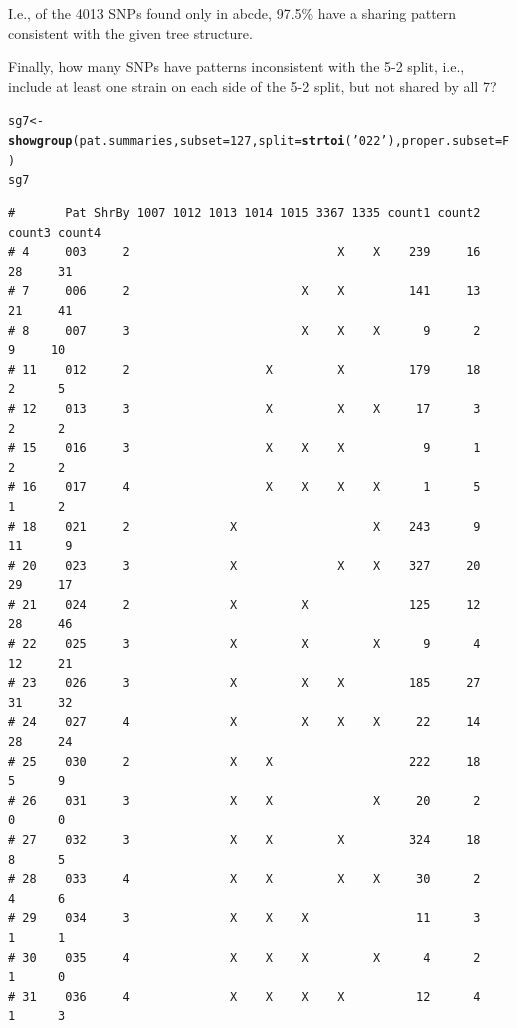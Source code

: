 \documentclass{article}\usepackage[]{graphicx}\usepackage[]{color}
\makeatletter
\newcommand{\hlnum}[1]{\textcolor[rgb]{0.686,0.059,0.569}{#1}}%
\newcommand{\hlstr}[1]{\textcolor[rgb]{0.192,0.494,0.8}{#1}}%
\newcommand{\hlstd}[1]{\textcolor[rgb]{0.345,0.345,0.345}{#1}}%
\newcommand{\hlkwb}[1]{\textcolor[rgb]{0.69,0.353,0.396}{#1}}%
\newcommand{\hlkwc}[1]{\textcolor[rgb]{0.333,0.667,0.333}{#1}}%
\newcommand{\hlkwd}[1]{\textcolor[rgb]{0.737,0.353,0.396}{\textbf{#1}}}%
\newenvironment{kframe}{%
 \def\at@end@of@kframe{}%
 \ifinner\ifhmode%
  \def\at@end@of@kframe{\end{minipage}}%
  \begin{minipage}{\columnwidth}%
 \fi\fi%
 \def\FrameCommand##1{\hskip\@totalleftmargin \hskip-\fboxsep
 \colorbox{shadecolor}{##1}\hskip-\fboxsep
     \hskip-\linewidth \hskip-\@totalleftmargin \hskip\columnwidth}%
 \MakeFramed {\advance\hsize-\width
   \@totalleftmargin\z@ \linewidth\hsize
   \@setminipage}}%
 {\par\unskip\endMakeFramed%
 \at@end@of@kframe}
\newenvironment{knitrout}{}{} %
\makeatother
\begin{document}
I.e., of the 4013 SNPs found only in abcde, 97.5\% have a sharing pattern consistent with the given tree structure.

Finally, how many SNPs have patterns inconsistent with the 5-2 split, i.e., include at least one strain on each side of the 5-2 split, but not shared by all 7?

\begin{knitrout}\footnotesize
{}\color{fgcolor}\begin{kframe}
\begin{alltt}
\hlstd{sg7} \hlkwb{<-} \hlkwd{showgroup}\hlstd{(pat.summaries,} \hlkwc{subset}\hlstd{=}\hlnum{127}\hlstd{,} \hlkwc{split}\hlstd{=}\hlkwd{strtoi}\hlstd{(}\hlstr{'022'}\hlstd{),} \hlkwc{proper.subset}\hlstd{=F)}
\hlstd{sg7}
\end{alltt}
\begin{verbatim}
#       Pat ShrBy 1007 1012 1013 1014 1015 3367 1335 count1 count2 count3 count4
# 4     003     2                             X    X    239     16     28     31
# 7     006     2                        X    X         141     13     21     41
# 8     007     3                        X    X    X      9      2      9     10
# 11    012     2                   X         X         179     18      2      5
# 12    013     3                   X         X    X     17      3      2      2
# 15    016     3                   X    X    X           9      1      2      2
# 16    017     4                   X    X    X    X      1      5      1      2
# 18    021     2              X                   X    243      9     11      9
# 20    023     3              X              X    X    327     20     29     17
# 21    024     2              X         X              125     12     28     46
# 22    025     3              X         X         X      9      4     12     21
# 23    026     3              X         X    X         185     27     31     32
# 24    027     4              X         X    X    X     22     14     28     24
# 25    030     2              X    X                   222     18      5      9
# 26    031     3              X    X              X     20      2      0      0
# 27    032     3              X    X         X         324     18      8      5
# 28    033     4              X    X         X    X     30      2      4      6
# 29    034     3              X    X    X               11      3      1      1
# 30    035     4              X    X    X         X      4      2      1      0
# 31    036     4              X    X    X    X          12      4      1      3

\end{verbatim}
\end{kframe}
\end{knitrout}
\end{document}
